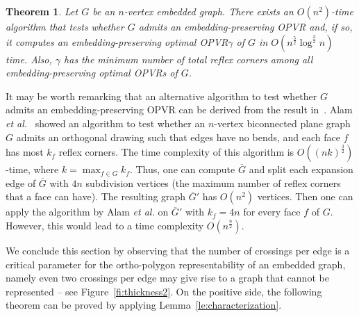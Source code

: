 \documentclass{article}
\newtheorem{theorem}{Theorem}
\newcommand{\opvr}{OPVR\xspace}
\newcommand{\bG}{\overline{G}}
\begin{document}
\begin{theorem}\label{th:test-opt}
Let $G$ be an $n$-vertex embedded graph. There exists an $O(n^2)$-time algorithm that tests whether $G$ admits an embedding-preserving \opvr and, if so, it computes an embedding-preserving optimal \opvr $\gamma$ of $G$ in $O(n^{\frac{5}{2}}\log^{\frac{3}{2}}n)$ time.  Also, $\gamma$ has the minimum number of total reflex corners among all embedding-preserving optimal {\opvr}s of $G$.
\end{theorem}

It may be worth remarking that an alternative algorithm to test whether $G$ admits an embedding-preserving \opvr can be derived from the result in~\cite{DBLP:conf/sofsem/AlamKM16}. Alam {\em et al.}~\cite{DBLP:conf/sofsem/AlamKM16} showed an  algorithm to test whether an $n$-vertex biconnected plane graph $G$ admits an orthogonal drawing such that edges have no bends, and each face $f$ has most $k_f$ reflex corners. The time complexity of this algorithm is $O((nk)^{\frac{3}{2}})$-time, where $k = \max_{f \in G}{k_f}$. Thus, one can compute $\bG$ and split each expansion edge of $\bG$ with $4n$ subdivision vertices (the maximum number of reflex corners that a face can have). The resulting graph $\bG'$ has $O(n^2)$ vertices. Then one can apply the algorithm by Alam {\em et al.} on $\bG'$ with $k_f = 4n$ for every face $f$ of $G$.  However, this would lead to a time complexity  $O(n^\frac{9}{2})$.

We conclude this section by observing that the number of crossings per edge is a critical parameter for the ortho-polygon representability of an embedded graph, namely even two crossings per edge may give rise to a graph that cannot be represented -- see Figure~\ref{fi:thickness2}. On the positive side, the following theorem can be proved by applying Lemma~\ref{le:characterization}.
\end{document}

